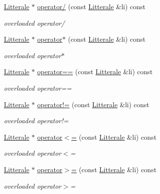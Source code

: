\begin{DoxyCompactItemize}
\hyperlink{class_litterale}{Litterale} $\ast$ \hyperlink{class_li_rationnelle_a0c072bf37fa144a665fc30b36eba0a4c}{operator/} (const \hyperlink{class_litterale}{Litterale} \&li) const 
\begin{DoxyCompactList}\small\item\em overloaded operator/ \end{DoxyCompactList}\item 
\hyperlink{class_litterale}{Litterale} $\ast$ \hyperlink{class_li_rationnelle_a32577e06c8316232a45147b36d9cde06}{operator$\ast$} (const \hyperlink{class_litterale}{Litterale} \&li) const 
\begin{DoxyCompactList}\small\item\em overloaded operator$\ast$ \end{DoxyCompactList}\item 
\hyperlink{class_litterale}{Litterale} $\ast$ \hyperlink{class_li_rationnelle_a27349b75404a5b881da73f5a7362a6a8}{operator==} (const \hyperlink{class_litterale}{Litterale} \&li) const 
\begin{DoxyCompactList}\small\item\em overloaded operator== \end{DoxyCompactList}\item 
\hyperlink{class_litterale}{Litterale} $\ast$ \hyperlink{class_li_rationnelle_a6c9e22c2e191a15a334377b1feb0c8ef}{operator!=} (const \hyperlink{class_litterale}{Litterale} \&li) const 
\begin{DoxyCompactList}\small\item\em overloaded operator!= \end{DoxyCompactList}\item 
\hyperlink{class_litterale}{Litterale} $\ast$ \hyperlink{class_li_rationnelle_a74044fa6f0d605d5bd9c806b14f34391}{operator$<$=} (const \hyperlink{class_litterale}{Litterale} \&li) const 
\begin{DoxyCompactList}\small\item\em overloaded operator$<$= \end{DoxyCompactList}\item 
\hyperlink{class_litterale}{Litterale} $\ast$ \hyperlink{class_li_rationnelle_a40b97ae950c490bde9f0325dbdfb268d}{operator$>$=} (const \hyperlink{class_litterale}{Litterale} \&li) const 
\begin{DoxyCompactList}\small\item\em overloaded operator$>$= \end{DoxyCompactList}\item 

\end{DoxyCompactItemize}
